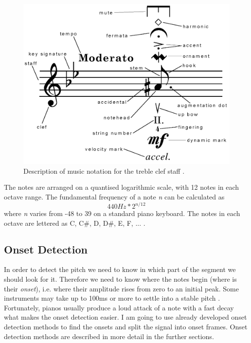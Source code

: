 \documentclass[11pt]{article} %
\begin{document}
\begin{figure}[h!]
\begin{center}
\includegraphics[scale=0.2]{note}
\end{center}
\caption{Description of music notation for the treble clef staff \citep*{notesWebsite}.}
\label{fig:notes}
\end{figure}

The notes are arranged on a quantised logarithmic scale, with 12 notes in each octave range. The fundamental frequency of a note \textit{n} can be calculated as 
\[440 Hz * 2^{n/12}  \]
where \textit{n} varies from -48 to 39 on a standard piano keyboard. The notes in each octave are lettered as C, C\#, D, D\#, E, F, ...  \citep*{Klapuri2006}.

\subsection{Onset Detection}
In order to detect the pitch we need to know in which part of the segment we should look for it. Therefore we need to know where the notes begin (where is their \textit{onset}), i.e. where their amplitude rises from zero to an initial peak. Some instruments may take up to 100ms or more to settle into a stable pitch \citep*{Roads1996}. Fortunately, pianos usually produce a loud attack of a note with a fast decay what makes the onset detection easier. I am going to use already developed onset detection methods to find the onsets and split the signal into onset frames. Onset detection methods are described in more detail in the further sections. 
\end{document}
